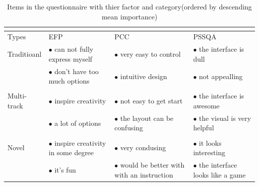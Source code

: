 \begin{table}[h]
  \centering
  \begin{tabular}{ |p{2cm}|p{3.2cm}|p{3.2cm}|p{3.2cm}|}
   \multicolumn{4}{l}{} \\
   \hline
   Types & EFP  & PCC  & PSSQA \\
   \hline
   Traditioanl & $\bullet$ can not fully express myself & $\bullet$ very easy to control & $\bullet$ the interface is dull\\
   & $\bullet$ don't have too much options &  $\bullet$ intuitive design & $\bullet$ not appealling\\
   & & &\\
   \hline
   Multi-track  & $\bullet$ inspire creativity & $\bullet$ not easy to get start & $\bullet$ the interface is awesome\\
   & $\bullet$ a lot of options& $\bullet$ the layout can be confusing & $\bullet$ the visual  is very helpful\\
   & & &\\
   \hline
   Novel & $\bullet$ inspire creativity in some degree & $\bullet$ very condusing & $\bullet$ it looks interesting\\
   & $\bullet$ it's fun & $\bullet$ would be better with with an instruction & $\bullet$ the interface looks like a game\\

   \hline
  \end{tabular}
  \caption[l]{Items in the questionnaire with thier factor and category(ordered by descending mean importance)}
  \label{tab: suduko}
\end{table}

\bigskip
